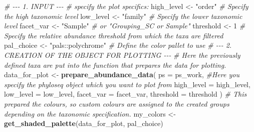 \documentclass[
]{article}
\newenvironment{Shaded}{\begin{snugshade}}{\end{snugshade}}
\newcommand{\AttributeTok}[1]{\textcolor[rgb]{0.13,0.29,0.53}{#1}}
\newcommand{\CommentTok}[1]{\textcolor[rgb]{0.56,0.35,0.01}{\textit{#1}}}
\newcommand{\DecValTok}[1]{\textcolor[rgb]{0.00,0.00,0.81}{#1}}
\newcommand{\FunctionTok}[1]{\textcolor[rgb]{0.13,0.29,0.53}{\textbf{#1}}}
\newcommand{\NormalTok}[1]{#1}
\newcommand{\OtherTok}[1]{\textcolor[rgb]{0.56,0.35,0.01}{#1}}
\newcommand{\StringTok}[1]{\textcolor[rgb]{0.31,0.60,0.02}{#1}}
\begin{document}
\begin{Shaded}
\begin{Highlighting}[]
\CommentTok{\# {-}{-}{-} 1. INPUT {-}{-}{-}}
\CommentTok{\# specify the plot specifics:}
\NormalTok{high\_level }\OtherTok{\textless{}{-}} \StringTok{"order"} \CommentTok{\# Specify the high taxonomic level}
\NormalTok{low\_level  }\OtherTok{\textless{}{-}} \StringTok{"family"} \CommentTok{\# Specify the lower taxonomic level}
\NormalTok{facet\_var  }\OtherTok{\textless{}{-}} \StringTok{"Sample"} \CommentTok{\# or "Grouping\_SC or Sample"}
\NormalTok{threshold  }\OtherTok{\textless{}{-}} \DecValTok{1} \CommentTok{\# Specify the relative abundance threshold from which the taxa are filtered}
\NormalTok{pal\_choice  }\OtherTok{\textless{}{-}} \StringTok{"pals::polychrome"} \CommentTok{\# Define the color pallet to use}
\CommentTok{\# {-}{-}{-} 2. CREATION OF THE OBJECT FOR PLOTTING {-}{-}{-}}
\CommentTok{\# Here the previously defined taxa are put into the function that prepares the data for plotting.}
\NormalTok{data\_for\_plot }\OtherTok{\textless{}{-}} \FunctionTok{prepare\_abundance\_data}\NormalTok{(}
  \AttributeTok{ps         =}\NormalTok{ ps\_work, }\CommentTok{\#Here you specify the phyloseq object which you want to plot from}
  \AttributeTok{high\_level =}\NormalTok{ high\_level,}
  \AttributeTok{low\_level  =}\NormalTok{ low\_level, }
  \AttributeTok{facet\_var  =}\NormalTok{ facet\_var, }
  \AttributeTok{threshold  =}\NormalTok{ threshold )}
\CommentTok{\# This prepared the colours, so custom colours are assigned to the created groups depending on the taxonomic specification.}
\NormalTok{my\_colors }\OtherTok{\textless{}{-}} \FunctionTok{get\_shaded\_palette}\NormalTok{(data\_for\_plot, pal\_choice)}


\end{Highlighting}
\end{Shaded}
\end{document}
